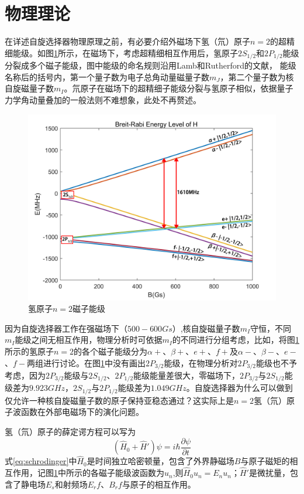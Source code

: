 \documentclass[UTF8]{ctexart}
\newcommand{\beq}{\begin{equation}}
\newcommand{\eeq}{\end{equation}}
\begin{document}
\section{物理理论}
在详述自旋选择器物理原理之前，有必要介绍外磁场下氢（氘）原子$n=2$的超精细能级。如图\ref{fig:BRH}所示，在磁场下，考虑超精细相互作用后，氢原子$2S_{1/2}$和$2P_{1/2}$能级分裂成多个磁子能级，图中能级的命名规则沿用Lamb和Rutherford的文献\cite{1950Fine}， 能级名称后的括号内，第一个量子数为电子总角动量磁量子数$m_J$，第二个量子数为核自旋磁量子数$m_I$。氘原子在磁场下的超精细子能级分裂与氢原子相似，依据量子力学角动量叠加的一般法则不难想象，此处不再赘述。
\begin{figure}[ht]
\centering
\includegraphics[scale=0.1]{BreitRabiH.jpg}
\caption{氢原子$n=2$磁子能级}
\label{fig:BRH}
\end{figure}

因为自旋选择器工作在强磁场下（$500-600Gs$）,核自旋磁量子数$m_I$守恒，不同$m_I$能级之间无相互作用，物理分析时可依据$m_I$的不同进行分组考虑，比如，将图\ref{fig:BRH}所示的氢原子$n=2$的各个磁子能级分为$\alpha+$、$\beta+$、$e+$、$f+$及$\alpha-$、$\beta-$、$e-$、$f-$两组进行讨论。在图\ref{fig:BRH}中没有画出$2P_{3/2}$能级，在物理分析对$2P_{3/2}$能级也不予考虑，因为$2P_{3/2}$能级与$2S_{1/2}$、$2P_{1/2}$能级能量差很大，零磁场下，$2P_{3/2}$与$2S_{1/2}$能级差为$9.923GHz$，$2S_{1/2}$与$2P_{1/2}$能级差为$1.049GHz$\cite{EnergyDiff}。自旋选择器为什么可以做到仅允许一种核自旋磁量子数的原子保持亚稳态通过？这实际上是$n=2$氢（氘）原子波函数在外部电磁场下的演化问题。

氢（氘）原子的薛定谔方程可以写为
\beq\label{eq:schrodinger}
(\hat{H}_0+\hat{H}')\psi=i\hbar\frac{\partial\psi}{\partial t}
\eeq
式\eqref{eq:schrodinger}中$\hat{H}_0$是时间独立哈密顿量，包含了外界静磁场$B$与原子磁矩的相互作用，记图\ref{fig:BRH}中所示的各磁子能级波函数为$u_n$,则$\hat{H}_0 u_n=E_n u_n$；$\hat{H}'$是微扰量，包含了静电场$E_s$和射频场$E_rf$、$B_rf$与原子的相互作用。
\end{document}

